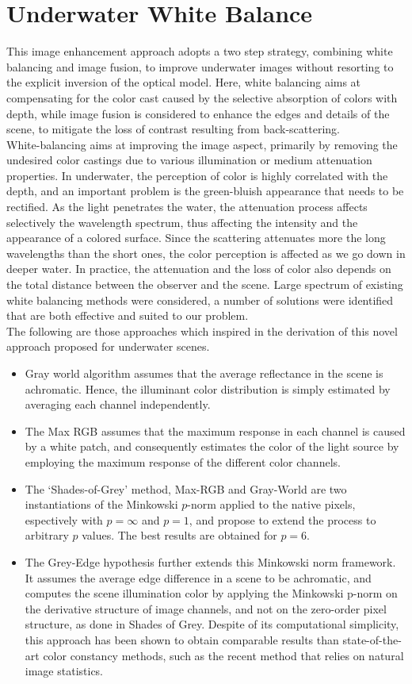 \documentclass[hidelinks, 12pt]{report}
\begin{document}
\chapter{Underwater White Balance}
\justify
This image enhancement approach adopts a two step strategy, combining white balancing and image fusion, to improve underwater images without resorting to the explicit inversion of the optical model. Here, white balancing aims at compensating for the color cast caused by the selective absorption of colors with depth, while image fusion is considered to enhance the edges and details of the scene, to mitigate the loss of contrast resulting from back-scattering.\\ White-balancing aims at improving the image aspect, primarily by removing the undesired color castings due to various illumination or medium attenuation properties. In underwater, the perception of color is highly correlated with the depth, and an important problem is the green-bluish appearance that needs to be rectified. As the light penetrates the water, the attenuation process affects selectively the wavelength spectrum, thus affecting the intensity and the appearance of a colored surface. Since the scattering attenuates more the long wavelengths than the short ones, the color perception is affected as we go down in deeper water. In practice, the attenuation and the loss of color also depends on the total distance between the observer and the scene. Large spectrum of existing white balancing methods were considered, a number of solutions were identified that are both effective and suited to our problem.\\ The following are those approaches which inspired in the derivation of this novel approach proposed for underwater scenes.
\begin{itemize}
\item{Gray world algorithm assumes that the average reflectance in the scene is achromatic. Hence, the illuminant color distribution is simply estimated by averaging each channel independently.}
\item{The Max RGB assumes that the maximum response in each channel is caused by a white patch, and consequently estimates the color of the light source by employing the maximum response of the different color channels.}
\item{The ‘Shades-of-Grey’ method, Max-RGB and Gray-World are two instantiations of the Minkowski $p$-norm applied to the native pixels,  espectively with $p=\infty$ and $p=1$, and propose to extend the process to arbitrary $p$ values. The best results are obtained for $p=6$.}
\item{The Grey-Edge hypothesis further extends this Minkowski norm framework. It assumes the average edge difference in a scene to be achromatic, and computes the scene illumination color by applying the Minkowski p-norm on the derivative structure of image channels, and not on the zero-order pixel structure, as done in Shades of Grey. Despite of its computational simplicity, this approach has been shown to obtain comparable results than state-of-the-art color constancy methods, such as the recent method that relies on natural image statistics.}
\end{itemize}
\end{document}
